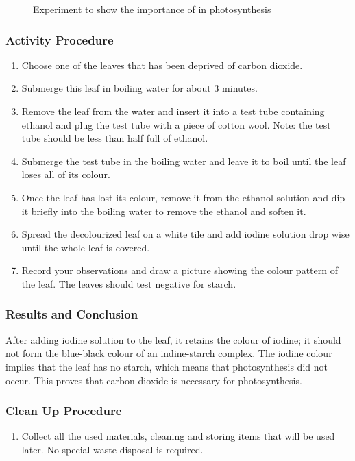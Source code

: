 \begin{figure}[h]
\begin{center}
\def\svgwidth{3cm}

\caption{Experiment to show the importance of  in photosynthesis}
\label{fig:CO2-photosynth}
\end{center}
\end{figure}
\subsubsection*{Activity Procedure}

\begin{enumerate}
\item{Choose one of the leaves that has been deprived of carbon dioxide.}
\item{Submerge this leaf in boiling water for about 3 minutes.}
\item{Remove the leaf from the water and insert it into a test tube containing ethanol and plug the test tube with a piece of cotton wool. Note: the test tube should be less than half full of ethanol.}
\item{Submerge the test tube in the boiling water and leave it to boil until the leaf loses all of its colour.}
\item{Once the leaf has lost its colour, remove it from the ethanol solution and dip it briefly into the boiling water to remove the ethanol and soften it.}
\item{Spread the decolourized leaf on a white tile and add iodine solution drop wise until the whole leaf is covered. }
\item{Record your observations and draw a picture showing the colour pattern of the leaf. The leaves should test negative for starch.}
\end{enumerate}

\subsubsection*{Results and Conclusion}
After adding iodine solution to the leaf, it retains the colour of iodine; it should not form the blue-black colour of an indine-starch complex. The iodine colour implies that the leaf has no starch, which means that photosynthesis did not occur. This proves that carbon dioxide is necessary for photosynthesis.

\subsubsection*{Clean Up Procedure}
\begin{enumerate}
\item{Collect all the used materials, cleaning and storing items that will be used later. No special waste disposal is required.}
\end{enumerate}

